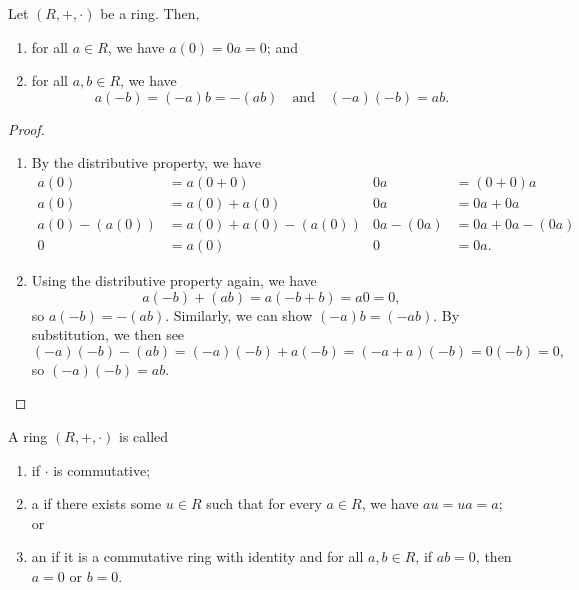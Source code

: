 \begin{prop}
Let $ (R,+,\cdot) $ be a ring. Then,
\begin{enumerate}
    \item for all $ a\in R $, we have $ a(0)=0a=0 $; and
    \item for all $ a,b\in R $, we have
    \begin{equation*}
        a(-b)=(-a)b=-(ab) \quad\text{and}\quad (-a)(-b)=ab.
    \end{equation*}
\end{enumerate}
\end{prop}
\begin{proof}~
\begin{enumerate}
    \item By the distributive property, we have
    \begin{align*}
        a(0) &= a(0+0) & 0a &= (0+0)a \\
        a(0) &= a(0)+a(0) & 0a &= 0a+0a \\
        a(0)-(a(0)) &= a(0)+a(0)-(a(0)) & 0a-(0a) &= 0a+0a-(0a) \\
        0 &= a(0) & 0 &= 0a.
    \end{align*}

    \item Using the distributive property again, we have
    \begin{equation*}
        a(-b)+(ab)=a(-b+b)=a0=0,
    \end{equation*}
    so $ a(-b)=-(ab) $. Similarly, we can show $ (-a)b=(-ab) $. By substitution, we then see
    \begin{equation*}
        (-a)(-b)-(ab)=(-a)(-b)+a(-b)=(-a+a)(-b)=0(-b)=0,
    \end{equation*}
    so $ (-a)(-b)=ab $.\qedhere
\end{enumerate}
\end{proof}

\begin{defn}\label{defn:ring_types}
A ring $ (R,+,\cdot) $ is called
\begin{enumerate}
    \item {} if $ \cdot $ is commutative;
    \item a  if there exists some $ u\in R $ such that for every $ a\in R $, we have $ au=ua=a $; or
    \item an  if it is a commutative ring with identity and for all $ a,b\in R $, if $ ab=0 $, then $ a=0 $ or $ b=0 $.
\end{enumerate}
\end{defn}


